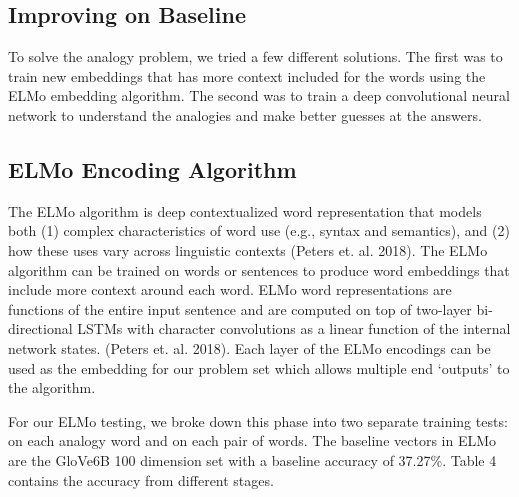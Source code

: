 \documentclass[11pt]{article}
\begin{document}


\subsection{Improving on Baseline}

To solve the analogy problem, we tried a few different solutions. The first was
to train new embeddings that has more context included for the words using the
ELMo embedding algorithm. The second was to train a deep convolutional neural
network to understand the analogies and make better guesses at the answers.

\subsection{ELMo Encoding Algorithm}

The ELMo algorithm is deep contextualized word representation that
models both (1) complex characteristics of word use (e.g., syntax and
semantics), and (2) how these uses vary across linguistic contexts
(Peters et. al. 2018). The ELMo algorithm can be trained on words or
sentences to produce word embeddings that include more context around
each word. ELMo word representations are functions of the entire input
sentence and are computed on top of two-layer bi-directional LSTMs with
character convolutions as a linear function of the internal network
states. (Peters et. al. 2018). Each layer of the ELMo encodings can be
used as the embedding for our problem set which allows multiple end
`outputs' to the algorithm.

For our ELMo testing, we broke down this phase into two separate
training tests: on each analogy word and on each pair of words. The
baseline vectors in ELMo are the GloVe6B 100 dimension set with a
baseline accuracy of 37.27\%. Table 4 contains the accuracy from
different stages.
\end{document}
